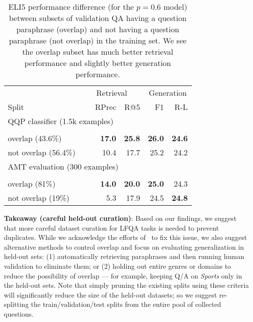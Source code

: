 \documentclass[11pt]{article}
\begin{document}
\begin{table}[t]
\small
\begin{center}
\begin{tabular}{ lrrrr } 
 \toprule
 & \multicolumn{2}{c}{Retrieval} & \multicolumn{2}{c}{Generation} \\
Split & ~~~RPrec & R@5 & F1 & R-L \\
\midrule
\multicolumn{5}{l}{QQP classifier (1.5k examples)}\\\\
overlap (43.6\%) & \textbf{17.0} & \textbf{25.8} & \textbf{26.0} & \textbf{24.6} \\
not overlap (56.4\%) & 10.4 & 17.7 & 25.2 & 24.2 \\
\midrule
\multicolumn{5}{l}{AMT evaluation (300 examples)}\\\\
overlap (81\%) & \textbf{14.0} & \textbf{20.0} & \textbf{25.0} & 24.3 \\
not overlap (19\%) & 5.3 & 17.9 & 24.5 & \textbf{24.8} \\
\bottomrule
\end{tabular}
\end{center}
\vspace{-0.1in}
\caption{ELI5 performance difference (for the $p=0.6$ model) between subsets of validation QA having a question paraphrase (overlap) and not having a question paraphrase (not overlap) in the training set. We see the overlap 
subset has much better retrieval performance and slightly better generation performance.}
\vspace{-0.1in}
\label{tab:overlap_vs_no_overlap}
\end{table}


\noindent \textbf{Takeaway (careful held-out curation)}: Based on our findings, we suggest that more careful dataset curation for LFQA tasks is needed to prevent duplicates. While we acknowledge the efforts of~\citet{fan-etal-2019-eli5} to fix this issue, we also suggest alternative methods to control overlap and focus on evaluating generalization in held-out sets: (1) automatically retrieving paraphrases and then running human validation to eliminate them; or (2) holding out entire genres or domains to reduce the possibility of overlap --- for example, keeping Q/A on \textit{Sports} only in the held-out sets. Note that simply pruning the existing splits using these criteria will significantly reduce the size of the held-out datasets; so we suggest re-splitting the train/validation/test splits from the entire pool of collected questions.
\end{document}
